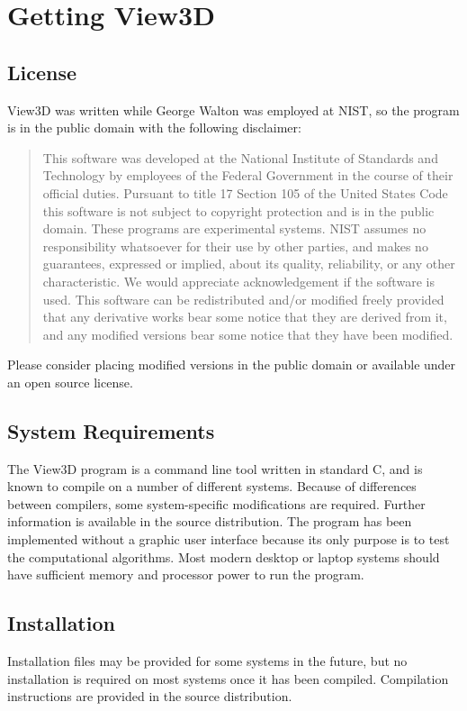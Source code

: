 \documentclass[10pt]{article}
\begin{document}
\section{Getting View3D}
\subsection{License}
View3D was written while George Walton was employed at NIST, so the program is
in the public domain with the following disclaimer:
\begin{quotation}
\noindent
This software was developed at the National Institute of Standards and 
Technology by employees of the Federal Government in the course of their 
official duties.  Pursuant to title 17 Section 105 of the United States Code 
this software is not subject to copyright protection and is in the public 
domain. These programs are experimental systems. NIST assumes no responsibility
whatsoever for their use by other parties, and makes no guarantees, expressed 
or implied, about its quality, reliability, or any other characteristic.   We
would appreciate acknowledgement if the software is used. This software can be
redistributed and/or modified freely provided that any derivative works bear
some notice that they are derived from it, and any modified versions bear some
notice that they have been modified.
\end{quotation}
\noindent
Please consider placing modified versions in the public domain or available
under an open source license.
\subsection{System Requirements}
The View3D program is a command line tool written in standard C, and is known
to compile on a number of different systems.  Because of differences between
compilers, some system-specific modifications are required.  Further
information is available in the source distribution. The program has been
implemented without a graphic user interface because its only purpose is to
test the computational algorithms.  Most modern desktop or laptop systems
should have sufficient memory and processor power to run the program.

\subsection{Installation}
Installation files may be provided for some systems in the future, but no
installation is required on most systems once it has been compiled. Compilation
instructions are provided in the source distribution.
\end{document}
